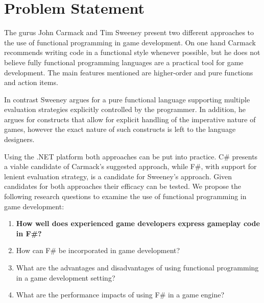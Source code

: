 \section{Problem Statement} \label{sec:problem_statement}
The gurus John Carmack and Tim Sweeney present two different approaches to the use of functional programming in game development. On one hand Carmack recommends writing code in a functional style whenever possible, but he does not believe fully functional programming languages are a practical tool for game development. The main features mentioned are higher-order and pure functions and action items.

In contrast Sweeney argues for a pure functional language supporting multiple evaluation strategies explicitly controlled by the programmer. In addition, he argues for constructs that allow for explicit handling of the imperative nature of games, however the exact nature of such constructs is left to the language designers.

Using the .NET platform both approaches can be put into practice. C\# presents a viable candidate of Carmack's suggested approach, while F\#, with support for lenient evaluation strategy, is a candidate for Sweeney's approach. Given candidates for both approaches their efficacy can be tested. We propose the following research questions to examine the use of functional programming in game development:

\begin{center}
    \begin{enumerate}
        \item \textbf{How well does experienced game developers express gameplay code in F\#?}
        \item How can F\# be incorporated in game development?
        \item What are the advantages and disadvantages of using functional programming in a game development setting?
        \item What are the performance impacts of using F\# in a game engine?
    \end{enumerate}
\end{center}